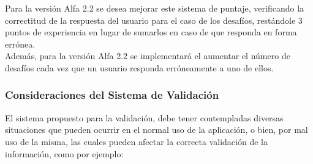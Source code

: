 \documentclass[10pt,letterpaper]{article}
\begin{document}
Para la versión Alfa 2.2 se desea mejorar este sistema de puntaje, verificando la correctitud de la respuesta del usuario para el caso de los desafíos, restándole 3 puntos de experiencia en lugar de sumarlos en caso de que responda en forma errónea.\\

Además, para la versión Alfa 2.2 se implementará el aumentar el número de desafíos cada vez que un usuario responda erróneamente a uno de ellos.\\

\subsubsection{Consideraciones del Sistema de Validación}

El sistema propuesto para la validación, debe tener contempladas diversas situaciones que pueden ocurrir en el normal uso de la aplicación, o bien, por mal uso de la misma, las cuales pueden afectar la correcta validación de la información, como por ejemplo:\\
\end{document}
